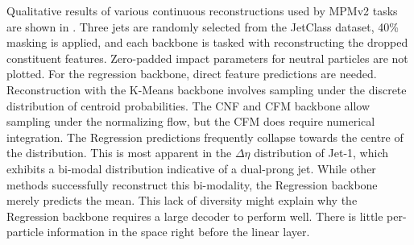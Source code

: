 Qualitative results of various continuous reconstructions used by MPMv2 tasks are shown in .
Three jets are randomly selected from the JetClass dataset, 40\% masking is applied, and each backbone is tasked with reconstructing the dropped constituent features.
Zero-padded impact parameters for neutral particles are not plotted.
For the regression backbone, direct feature predictions are needed.
Reconstruction with the K-Means backbone involves sampling under the discrete distribution of centroid probabilities.
The CNF and CFM backbone allow sampling under the normalizing flow, but the CFM does require numerical integration.
The Regression predictions frequently collapse towards the centre of the distribution.
This is most apparent in the $\Delta \eta$ distribution of Jet-1, which exhibits a bi-modal distribution indicative of a dual-prong jet.
While other methods successfully reconstruct this bi-modality, the Regression backbone merely predicts the mean.
This lack of diversity might explain why the Regression backbone requires a large decoder to perform well.
There is little per-particle information in the space right before the linear layer.

